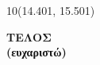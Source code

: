 \documentclass[fleqn]{article}
\begin{document}



\newpage

\begin{textblock}{10}(14.401, 15.501)
    \boxed{\textbf{\LaTeX{}}}
\end{textblock}

\begin{center}
    \vspace*{\fill}
    \textbf{\LARGE{ΤΕΛΟΣ}} \\[0.001cm]
    \textbf{\hspace{0.1cm}(ευχαριστώ)}
    \\[0.1cm]
    \vspace*{\fill}
\end{center}
\end{document}

